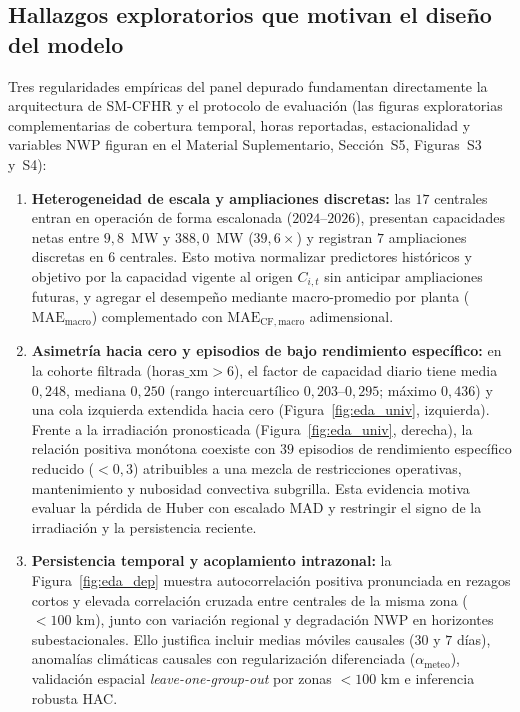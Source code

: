 \subsection{Hallazgos exploratorios que motivan el diseño del modelo}\label{sec:eda_motivacion}

Tres regularidades empíricas del panel depurado fundamentan directamente la arquitectura de SM-CFHR y el protocolo de evaluación (las figuras exploratorias complementarias de cobertura temporal, horas reportadas, estacionalidad y variables NWP figuran en el Material Suplementario, Sección~S5, Figuras~S3 y~S4):

\begin{enumerate}
    \item \textbf{Heterogeneidad de escala y ampliaciones discretas:} las $17$ centrales entran en operación de forma escalonada ($2024$--$2026$), presentan capacidades netas entre $9{,}8$~MW y $388{,}0$~MW ($39{,}6\times$) y registran $7$ ampliaciones discretas en $6$ centrales. Esto motiva normalizar predictores históricos y objetivo por la capacidad vigente al origen $C_{i,t}$ sin anticipar ampliaciones futuras, y agregar el desempeño mediante macro-promedio por planta ($\mathrm{MAE}_{\mathrm{macro}}$) complementado con $\mathrm{MAE}_{\mathrm{CF,macro}}$ adimensional.
    \item \textbf{Asimetría hacia cero y episodios de bajo rendimiento específico:} en la cohorte filtrada ($\mathrm{horas\_xm} > 6$), el factor de capacidad diario tiene media $0{,}248$, mediana $0{,}250$ (rango intercuartílico $0{,}203$--$0{,}295$; máximo $0{,}436$) y una cola izquierda extendida hacia cero (Figura~\ref{fig:eda_univ}, izquierda). Frente a la irradiación pronosticada (Figura~\ref{fig:eda_univ}, derecha), la relación positiva monótona coexiste con $39$ episodios de rendimiento específico reducido ($< 0{,}3$) atribuibles a una mezcla de restricciones operativas, mantenimiento y nubosidad convectiva subgrilla. Esta evidencia motiva evaluar la pérdida de Huber con escalado MAD y restringir el signo de la irradiación y la persistencia reciente.
    \item \textbf{Persistencia temporal y acoplamiento intrazonal:} la Figura~\ref{fig:eda_dep} muestra autocorrelación positiva pronunciada en rezagos cortos y elevada correlación cruzada entre centrales de la misma zona ($<100\text{ km}$), junto con variación regional y degradación NWP en horizontes subestacionales. Ello justifica incluir medias móviles causales ($30$ y $7$ días), anomalías climáticas causales con regularización diferenciada ($\alpha_{\mathrm{meteo}}$), validación espacial \textit{leave-one-group-out} por zonas $<100\text{ km}$ e inferencia robusta HAC.
\end{enumerate}

